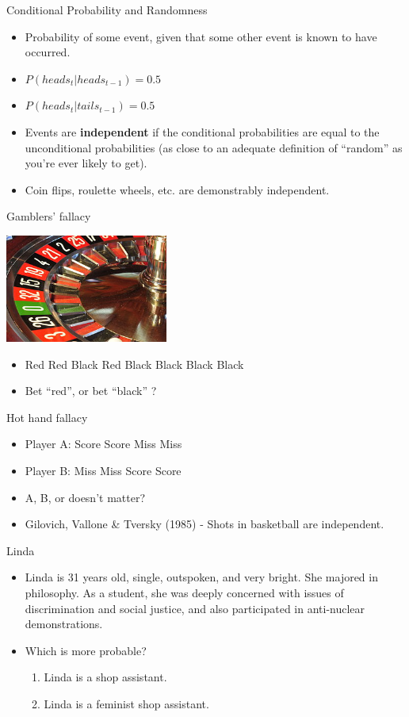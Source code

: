 \documentclass{beamer}
\begin{document}
\begin{frame}{Conditional Probability and Randomness}
\begin{itemize}
\item Probability of some event, given that some other event is known to have occurred.
\item $P(heads_{t}|heads_{t-1}) = 0.5$
\item $P(heads_{t}|tails_{t-1}) = 0.5$
\item Events are \textbf{independent} if the conditional probabilities are equal to the unconditional probabilities (as close to an adequate definition of ``random'' as you're ever likely to get).
\item Coin flips, roulette wheels, etc. are demonstrably independent. 
\end{itemize}
\end{frame}

\begin{frame}{Gamblers' fallacy}
\centerline{\includegraphics[width=0.4\textwidth]{pics/roulette.jpg}}
\begin{itemize}
\item Red Red Black Red Black Black Black Black 
\item Bet ``red'', or bet ``black'' ?
\end{itemize}
\end{frame}

\begin{frame}{Hot hand fallacy}
\begin{itemize}
\item Player A: Score Score Miss Miss
\item Player B: Miss Miss Score Score
\item A, B, or doesn't matter?
\item Gilovich, Vallone \& Tversky (1985) - Shots in basketball are independent.
\end{itemize}
\end{frame}

\begin{frame}{Linda}
\begin{itemize}
\item Linda is 31 years old, single, outspoken, and very bright. She majored in
  philosophy. As a student, she was deeply concerned with issues of
  discrimination and social justice, and also participated in anti-nuclear
  demonstrations.
\item Which is more probable?
\begin{enumerate}
\item Linda is a shop assistant.
\item Linda is a feminist shop assistant.
\end{enumerate}
\end{itemize}
\end{frame}
\end{document}
